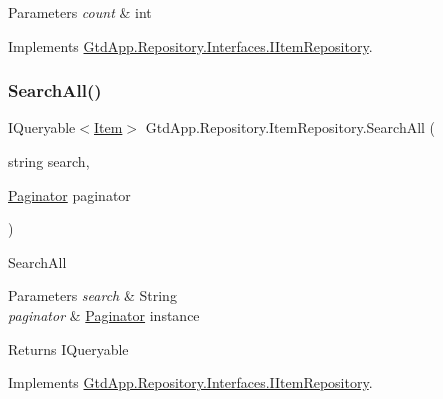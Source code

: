 \begin{DoxyParams}{Parameters}
{\em count} & int\\
\hline
\end{DoxyParams}


Implements \mbox{\hyperlink{interface_gtd_app_1_1_repository_1_1_interfaces_1_1_i_item_repository_a1dcdb14bc8a3355bdd81fd2d7837e051}{Gtd\+App.\+Repository.\+Interfaces.\+I\+Item\+Repository}}.

\mbox{\label{class_gtd_app_1_1_repository_1_1_item_repository_a9ec0b199ae1cd0fbb1d498c0496823b7}} 
\subsubsection{\texorpdfstring{Search\+All()}{SearchAll()}}
{\footnotesize\ttfamily I\+Queryable$<$\mbox{\hyperlink{class_gtd_app_1_1_data_1_1_item}{Item}}$>$ Gtd\+App.\+Repository.\+Item\+Repository.\+Search\+All (\begin{DoxyParamCaption}\item[{string}]{search,  }\item[{\mbox{\hyperlink{class_gtd_app_1_1_repository_1_1_paginator}{Paginator}}}]{paginator }\end{DoxyParamCaption})}



Search\+All 


\begin{DoxyParams}{Parameters}
{\em search} & String\\
\hline
{\em paginator} & \mbox{\hyperlink{class_gtd_app_1_1_repository_1_1_paginator}{Paginator}} instance\\
\hline
\end{DoxyParams}
\begin{DoxyReturn}{Returns}
I\+Queryable
\end{DoxyReturn}


Implements \mbox{\hyperlink{interface_gtd_app_1_1_repository_1_1_interfaces_1_1_i_item_repository_aaedb0ab68d51291cacb4a3c292bd3731}{Gtd\+App.\+Repository.\+Interfaces.\+I\+Item\+Repository}}.

\mbox{\label{class_gtd_app_1_1_repository_1_1_item_repository_a304576bc3ab1770c40e5caa41ebbf218}} 
